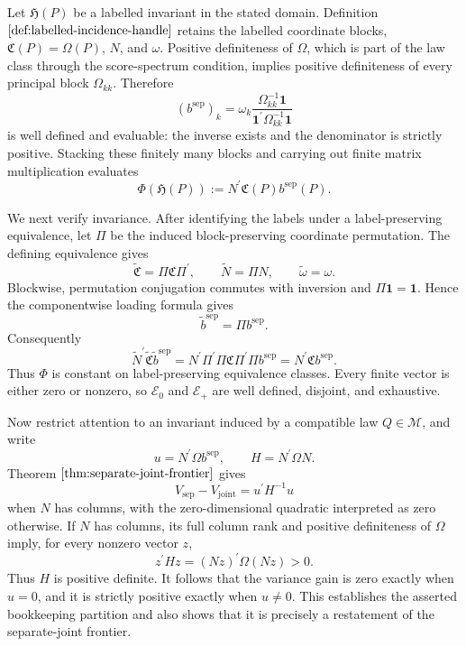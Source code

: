 Let \(\mathfrak H(P)\) be a labelled invariant in the stated domain. Definition \(\ref{def:labelled-incidence-handle}\) retains the labelled coordinate blocks, \(\mathfrak C(P)=\Omega(P)\), \(N\), and \(\omega\). Positive definiteness of \(\Omega\), which is part of the law class through the score-spectrum condition, implies positive definiteness of every principal block \(\Omega_{kk}\). Therefore
\[
 (b^{\mathrm{sep}})_k
 =\omega_k\frac{\Omega_{kk}^{-1}\mathbf 1}
 {\mathbf 1^{\prime}\Omega_{kk}^{-1}\mathbf 1}
\]
is well defined and evaluable: the inverse exists and the denominator is strictly positive. Stacking these finitely many blocks and carrying out finite matrix multiplication evaluates
\[
 \Phi(\mathfrak H(P))
 :=N^{\prime}\mathfrak C(P)b^{\mathrm{sep}}(P).
\]

We next verify invariance. After identifying the labels under a label-preserving equivalence, let \(\Pi\) be the induced block-preserving coordinate permutation. The defining equivalence gives
\[
 \widetilde{\mathfrak C}=\Pi\mathfrak C\Pi^{\prime},
 \qquad
 \widetilde N=\Pi N,
 \qquad
 \widetilde\omega=\omega.
\]
Blockwise, permutation conjugation commutes with inversion and \(\Pi\mathbf 1=\mathbf 1\). Hence the componentwise loading formula gives
\[
 \widetilde b^{\mathrm{sep}}=\Pi b^{\mathrm{sep}}.
\]
Consequently
\[
 \widetilde N^{\prime}\widetilde{\mathfrak C}
 \widetilde b^{\mathrm{sep}}
 =N^{\prime}\Pi^{\prime}\Pi\mathfrak C\Pi^{\prime}\Pi
 b^{\mathrm{sep}}
 =N^{\prime}\mathfrak Cb^{\mathrm{sep}}.
\]
Thus \(\Phi\) is constant on label-preserving equivalence classes. Every finite vector is either zero or nonzero, so \(\mathscr E_0\) and \(\mathscr E_+\) are well defined, disjoint, and exhaustive.

Now restrict attention to an invariant induced by a compatible law \(Q\in\mathcal M\), and write
\[
 u=N^{\prime}\Omega b^{\mathrm{sep}},
 \qquad
 H=N^{\prime}\Omega N.
\]
Theorem \(\ref{thm:separate-joint-frontier}\) gives
\[
 V_{\mathrm{sep}}-V_{\mathrm{joint}}=u^{\prime}H^{-1}u
\]
when \(N\) has columns, with the zero-dimensional quadratic interpreted as zero otherwise. If \(N\) has columns, its full column rank and positive definiteness of \(\Omega\) imply, for every nonzero vector \(z\),
\[
 z^{\prime}Hz=(Nz)^{\prime}\Omega(Nz)>0.
\]
Thus \(H\) is positive definite. It follows that the variance gain is zero exactly when \(u=0\), and it is strictly positive exactly when \(u\ne0\). This establishes the asserted bookkeeping partition and also shows that it is precisely a restatement of the separate-joint frontier.

